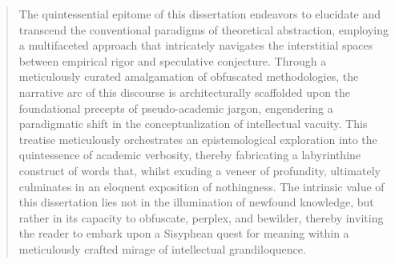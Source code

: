 \begin{abstract}
The quintessential epitome of this dissertation endeavors to elucidate and transcend the conventional paradigms of theoretical abstraction, employing a multifaceted approach that intricately navigates the interstitial spaces between empirical rigor and speculative conjecture. Through a meticulously curated amalgamation of obfuscated methodologies, the narrative arc of this discourse is architecturally scaffolded upon the foundational precepts of pseudo-academic jargon, engendering a paradigmatic shift in the conceptualization of intellectual vacuity. This treatise meticulously orchestrates an epistemological exploration into the quintessence of academic verbosity, thereby fabricating a labyrinthine construct of words that, whilst exuding a veneer of profundity, ultimately culminates in an eloquent exposition of nothingness. The intrinsic value of this dissertation lies not in the illumination of newfound knowledge, but rather in its capacity to obfuscate, perplex, and bewilder, thereby inviting the reader to embark upon a Sisyphean quest for meaning within a meticulously crafted mirage of intellectual grandiloquence.

\end{abstract}
